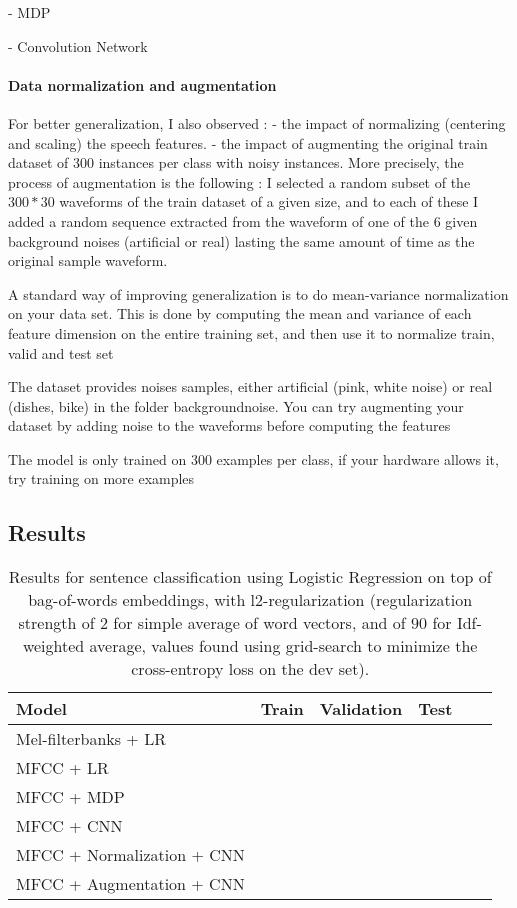 \documentclass[11pt]{article}
\begin{document}
- MDP

- Convolution Network

\paragraph{Data normalization and augmentation}

For better generalization, I also observed :
- the impact of normalizing (centering and scaling) the speech features.
- the impact of augmenting the original train dataset of 300 instances per class with noisy instances. More precisely, the process of augmentation is the following : I selected a random subset of the $300*30$ waveforms of the train dataset of a given size, and to each of these I added a random sequence extracted from the waveform of one of the $6$ given background noises (artificial or real) lasting the same amount of time as the original sample waveform.

A standard way of improving generalization is to do mean-variance normalization on your data set. This is done by computing the mean and variance of each feature dimension on the entire training set, and then use it to normalize train, valid and test set

The dataset provides noises samples, either artificial (pink, white noise) or real (dishes, bike) in the folder backgroundnoise. You can try augmenting your dataset by adding noise to the waveforms before computing the features

The model is only trained on 300 examples per class, if your hardware allows it, try training on more examples

\subsection{Results}


\begin{table}[h!]
\centering
  \begin{tabular}{|l|c|c|c|c|c|}  \hline
    Model    &  Train  & Validation & Test \\  \hline    
    Mel-filterbanks + LR & & & \\ \hline
    MFCC + LR & &  &\\ \hline
    MFCC + MDP & &  &\\ \hline
    MFCC + CNN & &  &\\ \hline
    MFCC + Normalization + CNN & &  &\\ \hline
    MFCC + Augmentation + CNN & &  &\\ \hline
  \end{tabular}
  \caption{Results for sentence classification using Logistic Regression on top of bag-of-words embeddings, with l2-regularization (regularization strength of $2$ for simple average of word vectors, and of $90$ for Idf-weighted average, values found using grid-search to minimize the cross-entropy loss on the dev set).}
\end{table}
\end{document}
